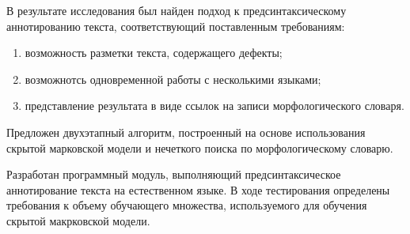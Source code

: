 В результате исследования был найден подход к предсинтаксическому аннотированию текста, соответствующий поставленным требованиям:
\begin{enumerate}
	\item 
	возможность разметки текста, содержащего дефекты;
	\item
	возможнотсь одновременной работы с несколькими языками;
	\item
	представление результата в виде ссылок на записи морфологического словаря.
\end{enumerate}

Предложен двухэтапный алгоритм, построенный на основе использования скрытой марковской модели и нечеткого поиска по морфологическому словарю.

Разработан программный модуль, выполняющий предсинтаксическое аннотирование текста на естественном языке. В ходе тестирования определены требования к объему обучающего множества, используемого для обучения скрытой макрковской модели.